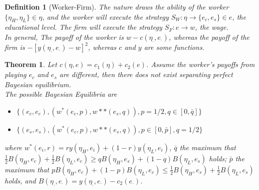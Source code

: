 \documentclass[12pt]{article}
\newtheorem{definition}{Definition}[section]
\newtheorem{theorem}{Theorem}[section]
\theoremstyle{definition}
\begin{document}
\begin{definition}[Worker-Firm]
\normalfont The nature draws the ability of the worker $\{\eta_H, \eta_L\}\in \eta$, and the worker will execute the strategy $S_W:\eta\to \{e_c, e_s\}\in e$, the educational level. The firm will execute the strategy $S_F: e\to w$, the wage.\\
In general, The payoff of the worker is $w-c(\eta_{\cdot}, e_{\cdot})$, whereas the payoff of the firm is $-[y(\eta_{\cdot}, e_{\cdot})-w]^2$, whereas $c$ and $y$ are some functions.
\end{definition}
\begin{theorem}\normalfont Let $c(\eta, e)=c_1(\eta)+c_2(e)$. Assume the worker's payoffs from playing $e_c$ and $e_s$ are different, then there does not exist separating perfect Bayesian equilibrium.\\
The possible Bayesian Equilibria are
\begin{itemize}
  \item $\{(e_c,e_c), (w^\ast(e_c,p), w*\ast(e_s,q)), p=1/2, q\in [0, \bar{q}]\}$
  \item $\{(e_s,e_s), (w^\ast(e_c,p), w*\ast(e_s,q)), p\in [0, \bar{p}], q=1/2\}$
\end{itemize}
where $w^\ast(e_i, r)=ry(\eta_H, e_i)+(1-r)y(\eta_L, e_i)$, $\bar{q}$ the maximum that $\frac{1}{2}B(\eta_H,e_c)+\frac{1}{2}B(\eta_L, e_c)\geq qB(\eta_H, e_s)+(1-q)B(\eta_L, e_s)$ holds; $\bar{p}$ the maximum that $pB(\eta_H,e_c)+(1-p)B(\eta_L, e_c)\leq \frac{1}{2}B(\eta_H, e_s)+\frac{1}{2}B(\eta_L, e_s)$ holds, and $B(\eta_{\cdot}, e_{\cdot})=y(\eta_{\cdot}, e_{\cdot})-c_2(e_{\cdot})$.
\end{theorem}
\end{document}
